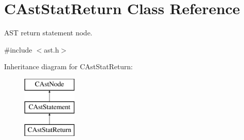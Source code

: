 \hypertarget{classCAstStatReturn}{\section{C\-Ast\-Stat\-Return Class Reference}
\label{classCAstStatReturn}
}


A\-S\-T return statement node.  




{\ttfamily \#include $<$ast.\-h$>$}

Inheritance diagram for C\-Ast\-Stat\-Return\-:\begin{figure}[H]
\begin{center}
\leavevmode
\includegraphics[height=3.000000cm]{classCAstStatReturn}
\end{center}
\end{figure}
